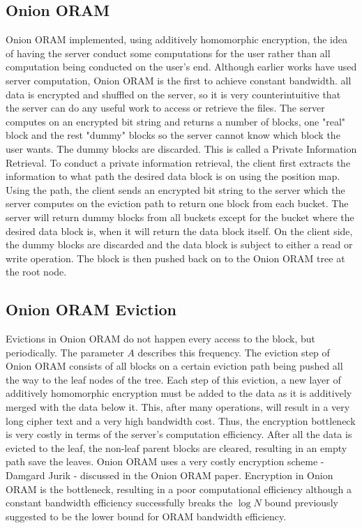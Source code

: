 \documentclass[12pt, oneside]{article}   	%
\begin{document}
\subsection{Onion ORAM}
Onion ORAM implemented, using additively homomorphic encryption, the idea of having the server conduct some computations for the user rather than all computation being conducted on the user's end. Although earlier works have used server computation, Onion ORAM is the first to achieve constant bandwidth. all data is encrypted and shuffled on the server, so it is very counterintuitive that the server can do any useful work to access or retrieve the files. The server computes on an encrypted bit string and returns a number of blocks, one "real" block and the rest "dummy" blocks so the server cannot know which block the user wants. The dummy blocks are discarded. This is called a Private Information Retrieval. To conduct a private information retrieval, the client first extracts the information to what path the desired data block is on using the position map. Using the path, the client sends an encrypted bit string to the server which the server computes on the eviction path to return one block from each bucket. The server will return dummy blocks from all buckets except for the bucket where the desired data block is, when it will return the data block itself. On the client side, the dummy blocks are discarded and the data block is subject to either a read or write operation. The block is then pushed back on to the Onion ORAM tree at the root node. 

\subsection{Onion ORAM Eviction}
Evictions in Onion ORAM do not happen every access to the block, but periodically. The parameter $A$ describes this frequency. The eviction step of Onion ORAM consists of all blocks on a certain eviction path being pushed all the way to the leaf nodes of the tree. Each step of this eviction, a new layer of additively homomorphic encryption must be added to the data as it is additively merged with the data below it. This, after many operations, will result in a very long cipher text and a very high bandwidth cost. Thus, the encryption bottleneck is very costly in terms of the server's computation efficiency. After all the data is evicted to the leaf, the non-leaf parent blocks are cleared, resulting in an empty path save the leaves. Onion ORAM uses a very costly encryption scheme - Damgard Jurik - discussed in the Onion ORAM paper. Encryption in Onion ORAM is the bottleneck, resulting in a poor computational efficiency although a constant bandwidth efficiency successfully breaks the $\log N$ bound previously suggested to be the lower bound for ORAM bandwidth efficiency.
\end{document}
